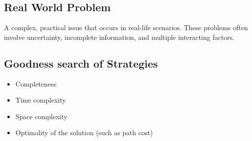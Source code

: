 \documentclass[a4paper, 12pt]{article}
\begin{document}
        \subsection*{Real World Problem}
        A complex, practical issue that occurs in real-life scenarios. These problems often involve uncertainty, incomplete information, and multiple interacting factors.
    \subsection{Goodness search of Strategies}
    \begin{itemize}
        \item Completeness
        \item Time complexity
        \item Space complexity
        \item Optimality of the solution (such as path cost)
    \end{itemize}

    \newpage
\end{document}
